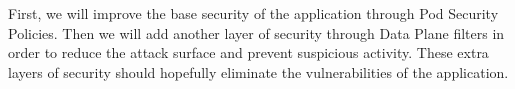 First, we will improve the base security of the application through Pod Security Policies.
Then we will add another layer of security through Data Plane filters in order to reduce the
attack surface and prevent suspicious activity. These extra layers of security should hopefully
eliminate the vulnerabilities of the application.

